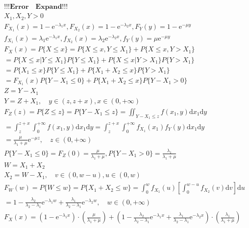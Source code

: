 \documentclass{article}
\begin{document}
\begin{align*}
    \mathbf{!!!Error \quad Expand!!!} \\
    X_{1}, X_{2}, Y > 0 \\
    F_{X_{1}}(x) = 1-\mathrm{e}^{-\lambda_{1} x}, F_{X_{2}}(x) = 1-\mathrm{e}^{-\lambda_{2} x}, F_{Y}(y) = 1-\mathrm{e}^{-\mu y}\\
    f_{X_{1}}(x) = \lambda_{1} \mathrm{e}^{-\lambda_{1} x}, f_{X_{2}}(x) = \lambda_{2} \mathrm{e}^{-\lambda_{2} x}, f_{Y}(y) = \mu \mathrm{e}^{-\mu y}\\
    F_{X}(x) = P\{X \le x\} = P\{X \le x, Y \le X_{1}\} + P\{X \le x, Y > X_{1}\}\\
    = P\{X \le x | Y \le X_{1}\} P\{Y \le X_{1}\} + P\{X \le x | Y > X_{1}\} P\{Y > X_{1}\}\\
    = P\{X_{1} \le x\}P\{Y \le X_{1}\} + P\{X_{1}+X_{2} \le x\}P\{Y > X_{1}\}\\
    = F_{X_{1}}(x)P\{Y-X_{1} \le 0\} + P\{X_{1}+X_{2} \le x\} P\{Y-X_{1} > 0\} \\
    Z = Y-X_{1} \\
    Y = Z + X_{1}, \quad  y \in (z,z+x), x \in (0,+\infty) \\
    F_{Z}(z) = P\{Z \le z\} = P\{Y-X_{1} \le z\} = \iint_{Y-X_{1} \le z}f(x_{1},y) \mathrm{d}x_{1}\mathrm{d}y\\ 
    = \int_{z}^{z+x} \int_{0}^{+\infty} f(x_{1},y) \mathrm{d}x_{1}\mathrm{d}y = \int_{z}^{z+x} \int_{0}^{+\infty} f_{X_{1}}(x_{1})f_{Y}(y) \mathrm{d}x_{1}\mathrm{d}y\\
    = \frac{\mu}{\lambda_{1}+\mu} \mathrm{e}^{-\mu z}, \quad z \in (0,+\infty) \\
    P\{Y-X_{1} \le 0\} = F_{Z}(0) = \frac{\mu }{\lambda_{1}+\mu}, P\{Y-X_{1} > 0\} = \frac{\lambda_{1}}{{\lambda_{1}+\mu}}\\
    W = X_{1}+X_{2} \\ 
    X_{2} = W-X_{1}, \quad v \in (0, w-u), u \in (0,w)\\ 
    F_{W}(w) = P\{W \le w\} = P\{X_{1}+X_{2} \le w\} = \int_{0}^{w}f_{X_{1}}(u)\left[\int_{0}^{w-u} f_{X_{2}}(v)\mathrm{d}v\right] \mathrm{d}u\\
    = 1 - \frac{\lambda_{2}}{\lambda_{2}-\lambda_{1}} \mathrm{e}^{-\lambda_{1}w} + \frac{\lambda_{1}}{\lambda_{2}-\lambda_{1}} \mathrm{e}^{-\lambda_{2}w}, \quad w \in (0,+\infty)\\
    F_{X}(x) = \left(1-\mathrm{e}^{-\lambda_{1} x}\right) \cdot (\frac{\mu}{\lambda_{1}+\mu}) + \left(1 - \frac{\lambda_{2}}{\lambda_{2}-\lambda_{1}} \mathrm{e}^{-\lambda_{1}x} + \frac{\lambda_{1}}{\lambda_{2}-\lambda_{1}} \mathrm{e}^{-\lambda_{2}x}    \right)\cdot(\frac{\lambda_{1}}{\lambda_{1}+\mu})\\
    \\
\end{align*}
\end{document}
